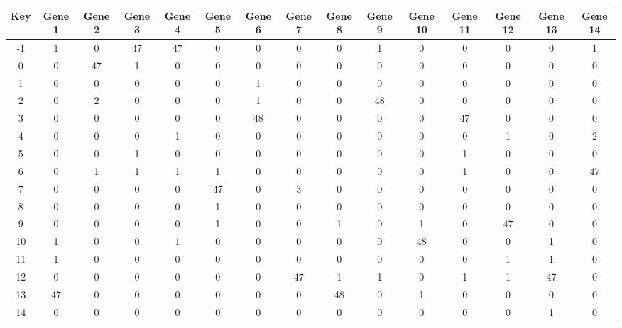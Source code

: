 \begin{tabular}{|c|c|c|c|c|c|c|c|c|c|c|c|c|c|c|}
\hline
Key & Gene 1 & Gene 2 & Gene 3 & Gene 4 & Gene 5 & Gene 6 & Gene 7 & Gene 8 & Gene 9 & Gene 10 & Gene 11 & Gene 12 & Gene 13 & Gene 14 \\
\hline
-1 & 1 & 0 & 47 & 47 & 0 & 0 & 0 & 0 & 1 & 0 & 0 & 0 & 0 & 1 \\
0 & 0 & 47 & 1 & 0 & 0 & 0 & 0 & 0 & 0 & 0 & 0 & 0 & 0 & 0 \\
1 & 0 & 0 & 0 & 0 & 0 & 1 & 0 & 0 & 0 & 0 & 0 & 0 & 0 & 0 \\
2 & 0 & 2 & 0 & 0 & 0 & 1 & 0 & 0 & 48 & 0 & 0 & 0 & 0 & 0 \\
3 & 0 & 0 & 0 & 0 & 0 & 48 & 0 & 0 & 0 & 0 & 47 & 0 & 0 & 0 \\
4 & 0 & 0 & 0 & 1 & 0 & 0 & 0 & 0 & 0 & 0 & 0 & 1 & 0 & 2 \\
5 & 0 & 0 & 1 & 0 & 0 & 0 & 0 & 0 & 0 & 0 & 1 & 0 & 0 & 0 \\
6 & 0 & 1 & 1 & 1 & 1 & 0 & 0 & 0 & 0 & 0 & 1 & 0 & 0 & 47 \\
7 & 0 & 0 & 0 & 0 & 47 & 0 & 3 & 0 & 0 & 0 & 0 & 0 & 0 & 0 \\
8 & 0 & 0 & 0 & 0 & 1 & 0 & 0 & 0 & 0 & 0 & 0 & 0 & 0 & 0 \\
9 & 0 & 0 & 0 & 0 & 1 & 0 & 0 & 1 & 0 & 1 & 0 & 47 & 0 & 0 \\
10 & 1 & 0 & 0 & 1 & 0 & 0 & 0 & 0 & 0 & 48 & 0 & 0 & 1 & 0 \\
11 & 1 & 0 & 0 & 0 & 0 & 0 & 0 & 0 & 0 & 0 & 0 & 1 & 1 & 0 \\
12 & 0 & 0 & 0 & 0 & 0 & 0 & 47 & 1 & 1 & 0 & 1 & 1 & 47 & 0 \\
13 & 47 & 0 & 0 & 0 & 0 & 0 & 0 & 48 & 0 & 1 & 0 & 0 & 0 & 0 \\
14 & 0 & 0 & 0 & 0 & 0 & 0 & 0 & 0 & 0 & 0 & 0 & 0 & 1 & 0 \\
\hline
\end{tabular}